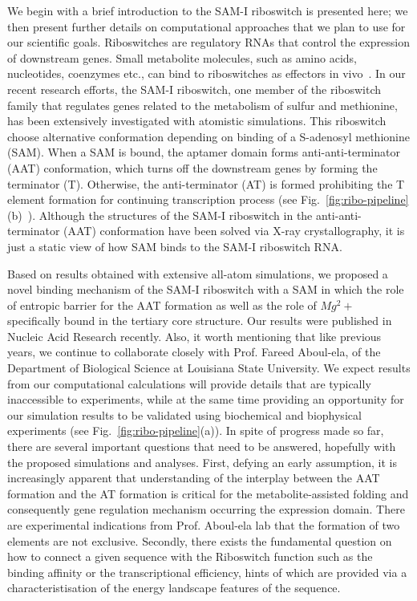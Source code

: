 \documentclass[a4paper,10pt]{article}
\begin{document}
We begin with a brief introduction to the SAM-I riboswitch is presented here; we then present further details on computational approaches that we plan to use for our scientific goals.  Riboswitches are regulatory RNAs that control the expression of downstream genes. Small metabolite molecules, such as amino acids, nucleotides, coenzymes etc., can bind to riboswitches as effectors in vivo~\cite{mandal}.  In our recent research efforts, the SAM-I riboswitch, one member of the riboswitch family that regulates genes related to the metabolism of sulfur and methionine, has been extensively investigated with atomistic simulations.  This riboswitch choose alternative conformation depending on binding of a S-adenosyl methionine (SAM).  When a SAM is bound, the aptamer domain forms anti-anti-terminator (AAT) conformation, which turns off the downstream genes by forming the terminator (T). Otherwise, the anti-terminator (AT) is formed prohibiting the T element formation for continuing transcription process (see Fig.~\ref{fig:ribo-pipeline}(b)~\cite{brooke}).  Although the structures of the SAM-I riboswitch in the anti-anti-terminator (AAT) conformation have been solved via X-ray crystallography, it is just a static view of how SAM binds to the SAM-I riboswitch RNA.  

Based on results obtained with extensive all-atom simulations, we proposed a novel binding mechanism of the SAM-I riboswitch with a SAM in which the role of entropic barrier for the AAT formation as well as the role of $Mg^2+$ specifically bound in the tertiary core structure.  Our results were published in Nucleic Acid Research recently\cite{SAM-I-NAR2009}.  Also, it worth mentioning that like previous years, we continue to collaborate closely with Prof. Fareed Aboul-ela, of the Department of Biological Science at Louisiana State University. We expect results from our computational calculations will provide details that are typically inaccessible to experiments, while at the same time providing an opportunity for our simulation results to be validated using biochemical and biophysical experiments (see Fig.~\ref{fig:ribo-pipeline}(a)).  In spite of progress made so far, there are several important questions that need to be answered, hopefully with the proposed simulations and analyses.  First, defying an early assumption, it is increasingly apparent that understanding of the interplay between the AAT formation and the AT formation is critical for the metabolite-assisted folding and consequently gene regulation mechanism occurring the expression domain.  There are experimental indications from Prof. Aboul-ela lab that the formation of two elements are not exclusive.  Secondly, there exists the fundamental question on how to connect a given sequence with the Riboswitch function such as the binding affinity or the transcriptional efficiency, hints of which are provided via a characteristisation of the energy landscape features of the sequence.
\end{document}
